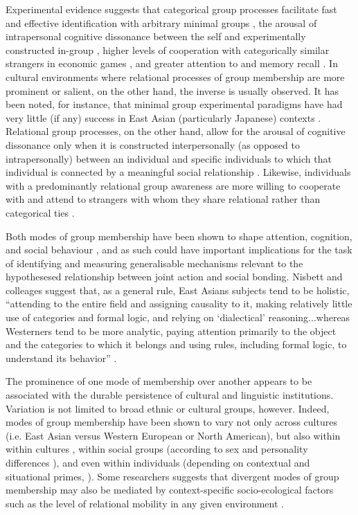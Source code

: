 {Experimental evidence suggests that categorical group processes facilitate fast and effective identification with arbitrary minimal groups \citep{Diehl1990,VanBavel2014}, the arousal of intrapersonal cognitive dissonance between the self and experimentally constructed in-group \citep{Festinger1957, Stone2001}, higher levels of cooperation with categorically similar strangers in economic games \citep{Yuki2005,Yuki2003}, and greater attention to and memory recall \citep{Buchan2006,Ng2016}.  In cultural environments where relational processes of group membership are more prominent or salient, on the other hand, the inverse is usually observed. It has been noted, for instance, that minimal group experimental paradigms have had very little (if any) success in East Asian (particularly Japanese) contexts \citep[586]{Liu2009}.  Relational group processes, on the other hand, allow for the arousal of cognitive dissonance only when it is constructed interpersonally (as opposed to intrapersonally) between an individual and specific individuals to which that individual is connected by a meaningful social relationship \citep{Hoshino-Browne2005}.  Likewise, individuals with a predominantly relational group awareness are more willing to cooperate with and attend to strangers with whom they share relational rather than categorical ties \citep{Ng2016,Yuki2005}.

Both modes of group membership have been shown to shape attention, cognition, and social behaviour \citep{Nisbett2003}, and as such could have important implications for the task of identifying and measuring generalisable mechanisms relevant to the hypothesesed relationship between joint action and social bonding.  Nisbett and colleages suggest that, as a general rule, East Asians subjects tend to be holistic, ``attending to the entire field and assigning causality to it, making relatively little use of categories and formal logic, and relying on ‘dialectical’ reasoning...whereas Westerners tend to be more analytic, paying attention primarily to the object and the categories to which it belongs and using rules, including formal logic, to understand its behavior'' \citep[291]{Nisbett2001}.

The prominence of one mode of membership over another appears to be
associated with the durable persistence of cultural and linguistic institutions.  Variation is not limited to broad ethnic or cultural groups, however. Indeed, modes of group membership have been shown to vary not only across cultures (i.e. East Asian versus Western European or North American), but also within within cultures \citep{Henrich2014}, within social groups (according to sex and personality differences \citep{Yuki2014}), and even within individuals (depending on contextual and situational primes, \citep{Lee2014,Wong2005}). Some researchers suggests that divergent modes of group membership may also be mediated by context-specific socio-ecological factors such as the level of relational mobility in any given environment \citep{Oishi2010,Takagishi2014,Yuki2005}.

}
